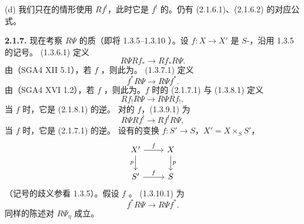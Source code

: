 (d) 我们只在的情形使用 $Rf^!$，此时它是 $f^!$ 的。仍有 (2.1.6.1)、(2.1.6.2) 的对应公式。

\textbf{2.1.7.} 现在考察 $R\Psi$ 的质（即将 1.3.5--1.3.10 ）。设 $f:X\to X'$ 是 $S$-，沿用 1.3.5 的记号。 (1.3.6.1) 定义
\[R\Psi Rf_*\longrightarrow Rf_*R\Psi.\tag{2.1.7.1}\]
由（SGA4 XII 5.1），若 $f$ ，则此为。 (1.3.7.1) 定义
\[f^*R\Psi\longrightarrow R\Psi f^*.\tag{2.1.7.2}\]
由（SGA4 XVI 1.2），若 $f$ ，则此为。$f$ 时的 (2.1.7.1) 与 (1.3.8.1)
定义
\[Rf_!R\Psi\longrightarrow R\Psi Rf_!,\tag{2.1.7.3}\]
当 $f$ 时，它是 (2.1.8.1) 的逆。
对的 $f$，(1.3.9.1) 为
\[R\Psi Rf^!\longrightarrow Rf^!R\Psi,\tag{2.1.7.4}\]
当 $f$ 时，它是 (2.1.7.1) 的逆。
设有的变换 $f:S'\to S$，$X'=X\times_SS'$，
\[
\begin{tikzcd}X'\arrow[r,"f"]\arrow[d,"p"']&X\arrow[d,"p"]\\S'\arrow[r,"f"]&S\end{tikzcd}
\]
（记号的歧义参看 1.3.5）。假设 $f$ 。 (1.3.10.1) 为
\[f^*R\Psi\longrightarrow R\Psi f^*.\tag{2.1.7.5}\]
同样的陈述对 $R\Psi_\eta$ 成立。

